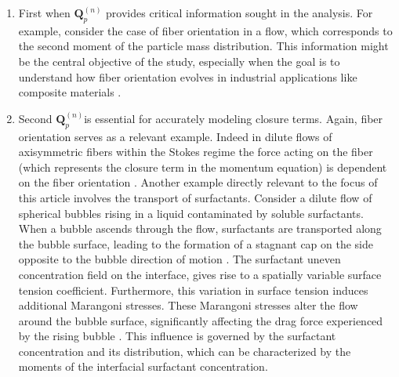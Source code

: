 \begin{enumerate}
\item First when $\textbf{Q}_p^{(n)}$ provides critical information sought in the analysis. 
For example, consider the case of fiber orientation in a flow, which corresponds to the second moment of the particle mass distribution. 
This information might be the central objective of the study, especially when the goal is to understand how fiber orientation evolves in industrial applications like composite materials \citep{advani1987use}.

\item Second $\textbf{Q}_p^{(n)}$is essential for accurately modeling closure terms. 
Again, fiber orientation serves as a relevant example. 
Indeed in dilute flows of axisymmetric fibers within the Stokes regime the force acting on the fiber (which represents the closure term in the momentum equation) is dependent on the fiber orientation \citep{kim2013microhydrodynamics}. %
Another example directly relevant to the focus of this article involves the transport of surfactants. 
Consider a dilute flow of spherical bubbles rising in a liquid contaminated by soluble surfactants. 
When a bubble ascends through the flow, surfactants are transported along the bubble surface, leading to the formation of a stagnant cap on the side opposite to the bubble direction of motion \citep{cuenot1997effects}.
The surfactant uneven concentration field on the interface, gives rise to a spatially variable surface tension coefficient. 
Furthermore, this variation in surface tension induces additional Marangoni stresses. %
These Marangoni stresses alter the flow around the bubble surface, significantly affecting the drag force experienced by the rising bubble \citep{cuenot1997effects,pesci2018computational}. 
This influence is governed by the surfactant concentration and its distribution, which can be characterized by the moments of the interfacial surfactant concentration.



\end{enumerate}
